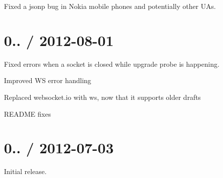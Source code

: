 \begin{DoxyItemize}
\item Fixed a jsonp bug in Nokia mobile phones and potentially other U\+As.
\end{DoxyItemize}

\section*{0.. / 2012-\/08-\/01 }


\begin{DoxyItemize}
\item Fixed errors when a socket is closed while upgrade probe is happening.
\item Improved WS error handling
\item Replaced websocket.\+io with ws, now that it supports older drafts
\item R\+E\+A\+D\+ME fixes
\end{DoxyItemize}

\section*{0.. / 2012-\/07-\/03 }


\begin{DoxyItemize}
\item Initial release. 
\end{DoxyItemize}